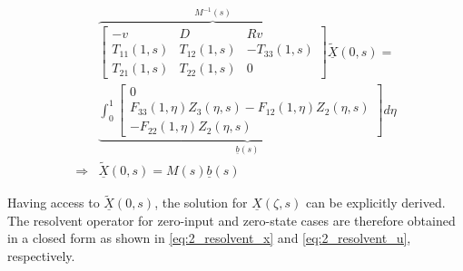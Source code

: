     \begin{equation} \label{eq:2_BC_AE}
    \begin{aligned}
            &\overbrace{\begin{bmatrix}
                -v & D & Rv\\
                T_{11}(1,s) & T_{12}(1,s) & -T_{33}(1,s)\\
                T_{21}(1,s) & T_{22}(1,s) & 0
            \end{bmatrix}}^{M^{-1}(s)} \underline{\tilde{X}}(0,s) =\\ 
            &\underbrace{\int_0^1 \begin{bmatrix}
                0\\ F_{33}(1, \eta) Z_3(\eta,s) - F_{12}(1, \eta) Z_2(\eta,s)\\ -F_{22}(1, \eta) Z_2(\eta,s)
            \end{bmatrix} d\eta}_{\underline{b}(s)} \\
            \Rightarrow &\underline{\tilde{X}}(0,s) = M(s) \underline{b}(s)
    \end{aligned}
    \end{equation}
    
    Having access to $\underline{\tilde{X}}(0,s)$, the solution for $\underline{X}(\zeta,s)$ can be explicitly derived. The resolvent operator for zero-input and zero-state cases are therefore obtained in a closed form as shown in \eqref{eq:2_resolvent_x} and \eqref{eq:2_resolvent_u}, respectively.
    
